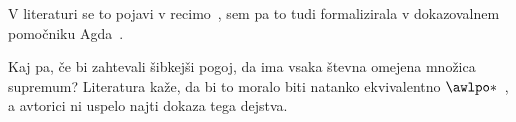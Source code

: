 V literaturi se to pojavi v recimo~\cite[trd.~D4.7.11]{Johnstone02}, sem pa to
tudi formalizirala v dokazovalnem pomočniku Agda~\cite{BS25}.

Kaj pa, če bi zahtevali šibkejši pogoj, da ima vsaka števna omejena množica
supremum? Literatura kaže, da bi to moralo biti natanko ekvivalentno
\(\awlpo*\)~\cite[vaja~3N.5]{GJ60}, a avtorici ni uspelo najti dokaza tega
dejstva.



